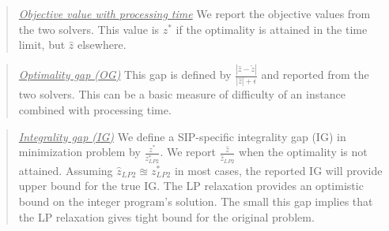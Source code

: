 \begin{quote}
	\noindent\underline{\textit{Objective value with processing time}} We report the objective values from the two solvers. This value is $z^*$ if the optimality is attained in the time limit, but $\hat{z}$ elsewhere.
\end{quote}

\begin{quote}
	\noindent\underline{\textit{Optimality gap (OG)}} This gap is defined by $\frac{|\hat{z}-\tilde{z}|}{|\hat{z}|+\epsilon}$ and  reported from the two solvers. This can be a basic measure of difficulty of an instance combined with processing time.
\end{quote}


\begin{quote}
	\noindent\underline{\textit{Integrality gap (IG)}} We define a SIP-specific integrality gap (IG) in minimization problem by $\frac{z^*}{z^*_{LP2}}$. We report $\frac{\hat{z}}{\hat{z}_{LP2}}$ when the optimality is not attained. Assuming $\hat{z}_{LP2}\approxeq z^*_{LP2}$ in most cases, the reported IG will provide upper bound for the true IG. The LP relaxation provides an optimistic bound on the integer program's solution. The small this gap implies that the LP relaxation gives tight bound for the original problem.  %
\end{quote}

